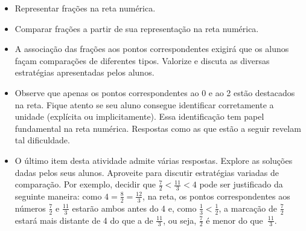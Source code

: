 \begin{atividade}\label{chap3-ativ18}
\objetivos
\begin{itemize} %
    \item       Representar frações na reta numérica.
    \item       Comparar frações a partir de sua representação na reta numérica.
\end{itemize} %

\discussoes
\begin{itemize}
    \item       A associação das frações aos pontos correspondentes exigirá que os alunos façam comparações de diferentes tipos. Valorize e discuta as diversas estratégias apresentadas pelos alunos.
    \item Observe que apenas os pontos correspondentes ao 0 e ao 2 estão destacados na reta. Fique atento se seu aluno consegue identificar corretamente a unidade (explícita ou implicitamente). Essa identificação tem papel fundamental na reta numérica. Respostas como as que estão a seguir revelam tal dificuldade.
      \begin{center}
      \end{center}
    \item       O último item desta atividade admite várias respostas. Explore as soluções dadas pelos seus alunos. Aproveite para discutir estratégias variadas de comparação. Por exemplo, decidir que $\frac{7}{2} < \frac{11}{3} < 4$ pode ser justificado da seguinte maneira: como $4 = \frac{8}{2} = \frac{12}{3}$, na reta, os pontos correspondentes aos números $\frac{7}{2}$ e $\frac{11}{3}$ estarão ambos antes do 4 e, como  $\frac{1}{3} < \frac{1}{2}$, a marcação de $\frac{7}{2}$ estará mais distante de 4 do que a de $\frac{11}{3}$, ou seja, $\frac{7}{2}$ é menor do que~$\frac{11}{3}$.
    \end{itemize} %


\end{atividade}
